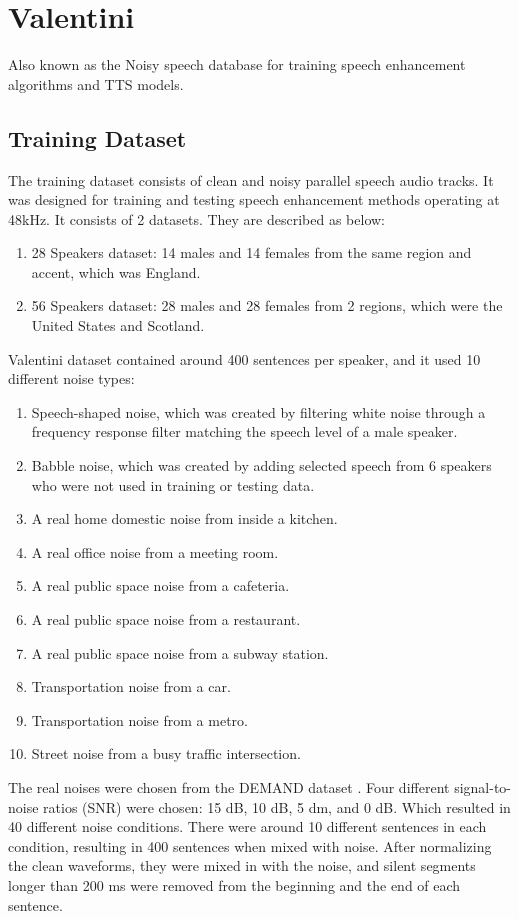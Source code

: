 \section{Valentini \cite{valentini2016}}
Also known as the Noisy speech database for training speech enhancement algorithms and TTS models.

\subsection{Training Dataset}
The training dataset consists of clean and noisy parallel speech audio tracks. It was designed for training and testing speech enhancement methods operating at 48kHz. It consists of 2 datasets. They are described as below:
\begin{enumerate}
    \item 28 Speakers dataset: 14 males and 14 females from the same region and accent, which was England.
    \item 56 Speakers dataset: 28 males and 28 females from 2 regions, which were the United States and Scotland.
\end{enumerate}
Valentini dataset contained around 400 sentences per speaker, and it used 10 different noise types:
\begin{enumerate}
    \item Speech-shaped noise, which was created by filtering white noise through a frequency response filter matching the speech level of a male speaker.
    \item Babble noise, which was created by adding selected speech from 6 speakers who were not used in training or testing data.
    \item A real home domestic noise from inside a kitchen.
    \item A real office noise from a meeting room.
    \item A real public space noise from a cafeteria.
    \item A real public space noise from a restaurant.
    \item A real public space noise from a subway station.
    \item Transportation noise from a car.
    \item Transportation noise from a metro.
    \item Street noise from a busy traffic intersection.
\end{enumerate}
The real noises were chosen from the DEMAND dataset \cite{thiemann2013}.
Four different signal-to-noise ratios (SNR) were chosen: 15 dB, 10 dB, 5 dm, and 0 dB. Which resulted in 40 different noise conditions. There were around 10 different sentences in each condition, resulting in 400 sentences when mixed with noise. After normalizing the clean waveforms, they were mixed in with the noise, and silent segments longer than 200 ms were removed from the beginning and the end of each sentence.

